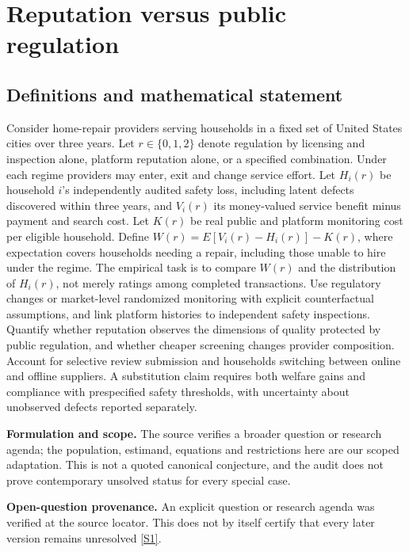 \documentclass[11pt]{article}
\newcommand{\sref}[2]{\hyperlink{source:#1:#2}{[S#2]}}
\begin{document}
\section*{Reputation versus public regulation}\label{30007687}
\subsection{Definitions and mathematical statement}
Consider home-repair providers serving households in a fixed set of United States cities over three years. Let \(r\in\{0,1,2\}\) denote regulation by licensing and inspection alone, platform reputation alone, or a specified combination. Under each regime providers may enter, exit and change service effort. Let \(H_i(r)\) be household \(i\)'s independently audited safety loss, including latent defects discovered within three years, and \(V_i(r)\) its money-valued service benefit minus payment and search cost. Let \(K(r)\) be real public and platform monitoring cost per eligible household. Define \(W(r)=E[V_i(r)-H_i(r)]-K(r)\), where expectation covers households needing a repair, including those unable to hire under the regime. The empirical task is to compare \(W(r)\) and the distribution of \(H_i(r)\), not merely ratings among completed transactions. Use regulatory changes or market-level randomized monitoring with explicit counterfactual assumptions, and link platform histories to independent safety inspections. Quantify whether reputation observes the dimensions of quality protected by public regulation, and whether cheaper screening changes provider composition. Account for selective review submission and households switching between online and offline suppliers. A substitution claim requires both welfare gains and compliance with prespecified safety thresholds, with uncertainty about unobserved defects reported separately.

\par\textbf{Formulation and scope.} The source verifies a broader question or research agenda; the population, estimand, equations and restrictions here are our scoped adaptation. This is not a quoted canonical conjecture, and the audit does not prove contemporary unsolved status for every special case.

\par\textbf{Open-question provenance.} An explicit question or research agenda was verified at the source locator. This does not by itself certify that every later version remains unresolved \sref{30007687}{1}.
\end{document}
